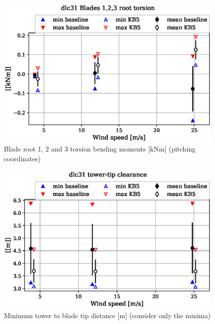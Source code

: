 \begin{figure}[!ht]
\begin{center}
	\includegraphics[width=.85\linewidth]{figures/baseline-vs-KB6/dlc31/blade1-blade1-node-001-momentvec-z_AA0007_AA0003.eps}
\end{center}
\caption{Blade root 1, 2 and 3 torsion bending moments [kNm] (pitching coordinates)}
\label{fig:baseline-vs-KB6:dlc31:blade-root-torsion}
\end{figure}

\begin{figure}[!ht]
\begin{center}
	\includegraphics[width=.85\linewidth]{figures/baseline-vs-KB6/dlc31/DLL-towerclearance_mblade-inpvec-1_AA0007_AA0003.eps}
\end{center}
\caption{Minimum tower to blade tip distance [m] (consider only the minima)}
\label{fig:baseline-vs-KB6:dlc31:tower-tip-clearance}
\end{figure}

